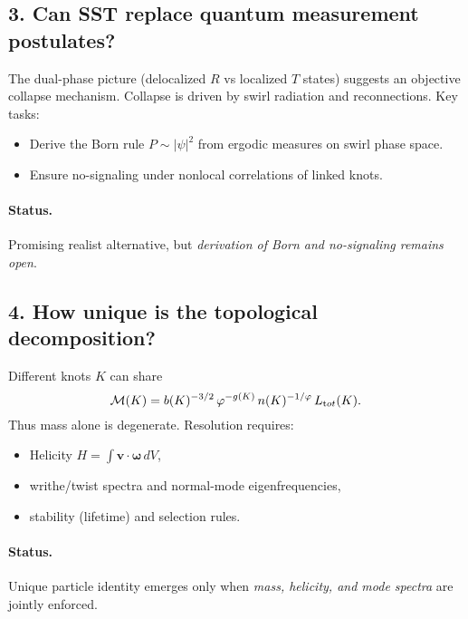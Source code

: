 \documentclass[11pt]{article}
\begin{document}
        \subsection*{3. Can SST replace quantum measurement postulates?}

        The dual-phase picture (delocalized $R$ vs localized $T$ states) suggests an objective collapse mechanism. Collapse is driven by swirl radiation and reconnections.
        Key tasks:
        \begin{itemize}
        \item Derive the Born rule $P\sim|\psi|^2$ from ergodic measures on swirl phase space.
        \item Ensure no-signaling under nonlocal correlations of linked knots.
        \end{itemize}

        \paragraph{Status.} Promising realist alternative, but \emph{derivation of Born and no-signaling remains open}.

        \subsection*{4. How unique is the topological decomposition?}

        Different knots $K$ can share
        \[
            \mathcal M(K)=b(K)^{-3/2}\,\varphi^{-g(K)}\,n(K)^{-1/\varphi}\,L_{\textrm tot}(K).
        \]
        Thus mass alone is degenerate. Resolution requires:
        \begin{itemize}
        \item Helicity $H=\int \mathbf v\!\cdot\!\boldsymbol\omega\,dV$,
        \item writhe/twist spectra and normal-mode eigenfrequencies,
        \item stability (lifetime) and selection rules.
        \end{itemize}

        \paragraph{Status.} Unique particle identity emerges only when \emph{mass, helicity, and mode spectra} are jointly enforced.
\end{document}
